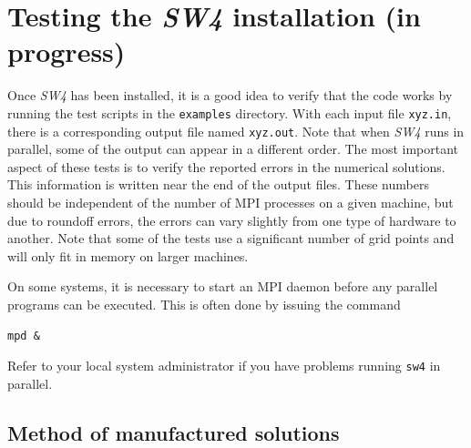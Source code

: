 \documentclass[11pt]{report}
\begin{document}

\chapter{Testing the \emph{SW4} installation (in progress)}\label{cha:testing-sw4}

Once \emph{SW4} has been installed, it is a good idea to verify that the code works by
running the test scripts in the \verb+examples+ directory. With each input file \verb+xyz.in+, there
is a corresponding output file named \verb+xyz.out+. Note that when \emph{SW4} runs in parallel,
some of the output can appear in a different order. The most important aspect of these tests is to
verify the reported errors in the numerical solutions. This information is written near the end of
the output files. These numbers should be independent of the number of MPI processes on a given
machine, but due to roundoff errors, the errors can vary slightly from one type of hardware to
another. Note that some of the tests use a significant number of grid points and will only fit in
memory on larger machines.

On some systems, it is necessary to start an MPI daemon before any parallel programs can be
executed. This is often done by issuing the command
\begin{verbatim}
mpd &
\end{verbatim}
Refer to your local system administrator if you have problems running \verb+sw4+ in parallel.

\section{Method of manufactured solutions}\label{sec:twilight}
\end{document}
